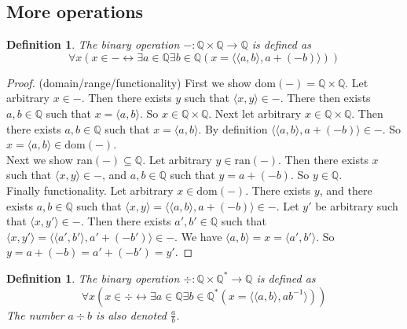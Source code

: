 \documentclass{report}
\newtheorem{definition}[theo]{Definition}
\begin{document}
\subsection{More operations}
\begin{definition}
The binary operation $-:\mathbb Q\times\mathbb Q\to\mathbb Q$ is defined as
\begin{equation*}
\forall x(x\in-\leftrightarrow\exists a\in\mathbb Q\exists b\in\mathbb Q(x=\langle\langle a,b\rangle,a+(-b)\rangle))
\end{equation*}
\end{definition}
\begin{proof}(domain/range/functionality)
First we show dom$(-)=\mathbb Q\times\mathbb Q$. Let arbitrary $x\in-$. Then there exists $y$ such that $\langle x,y\rangle\in-$. There then exists $a,b\in\mathbb Q$ such that 
$x=\langle a,b\rangle$. So $x\in\mathbb Q\times\mathbb Q$. Next let arbitrary $x\in\mathbb Q\times\mathbb Q$. 
Then there exists $a,b\in\mathbb Q$ such that $x=\langle a,b\rangle$. By definition $\langle\langle a,b\rangle,a+(-b)\rangle\in-$. So $x=\langle a,b\rangle\in\text{dom}(-)$.\\
\indent Next we show ran$(-)\subseteq\mathbb Q$. Let arbitrary $y\in\text{ran}(-)$. Then there exists $x$ such that $\langle x,y\rangle\in-$, and $a,b\in\mathbb Q$ such that $y=a+(-b)$. 
So $y\in\mathbb Q$.\\
\indent Finally functionality. Let arbitrary $x\in\text{dom}(-)$. There exists $y$, and there exists $a,b\in\mathbb Q$ such that $\langle x,y\rangle=\langle\langle a,b\rangle,a+(-b)\rangle\in-$. 
Let $y'$ be arbitrary such that $\langle x,y'\rangle\in-$. Then there exists 
$a',b'\in\mathbb Q$ such that $\langle x,y'\rangle=\langle\langle a',b'\rangle,a'+(-b')\rangle\in-$. 
We have $\langle a,b\rangle=x=\langle a',b'\rangle$. So $y=a+(-b)=a'+(-b')=y'$.
\end{proof}
\begin{definition}
The binary operation $\div:\mathbb Q\times\mathbb Q^*\to\mathbb Q$ is defined as
\begin{equation*}
\forall x(x\in\div\leftrightarrow\exists a\in\mathbb Q\exists b\in\mathbb Q^*(x=\langle\langle a,b\rangle,ab^{-1}\rangle))
\end{equation*}
The number $a\div b$ is also denoted $\frac{a}{b}$.
\end{definition}
\end{document}
